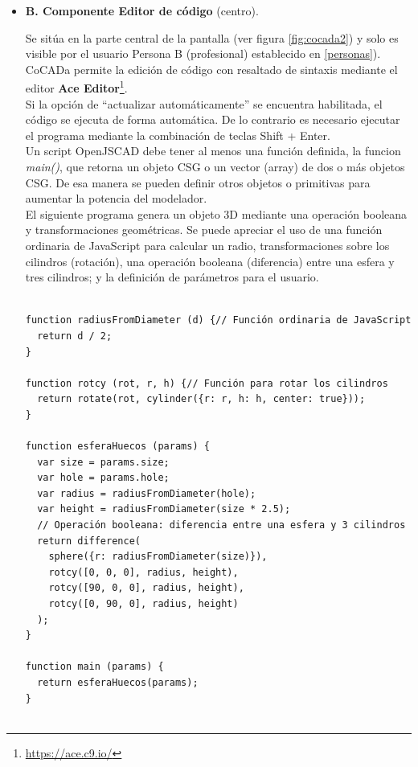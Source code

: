 \begin{itemize}
\item \textbf{B. Componente Editor de código} (centro).

\begin{itemize}
Se sitúa en la parte central de la pantalla (ver figura \ref{fig:cocada2}) y solo es visible por el usuario Persona B (profesional) establecido en \ref{personas}).\\
CoCADa permite la edición de código con  resaltado de sintaxis mediante el editor \textbf{\Gls{Ace Editor}}\footnote{\url{https://ace.c9.io/}}. \\Si la opción de ``actualizar automáticamente'' se encuentra habilitada, el código se ejecuta de forma automática. De lo contrario es necesario ejecutar el programa mediante la combinación de teclas Shift + Enter.\\ 
Un script OpenJSCAD debe tener al menos una función definida, la funcion \textit{main()}, que retorna un objeto CSG o un vector (array) de dos o más objetos CSG. De esa manera se pueden definir otros objetos o primitivas para aumentar la potencia del modelador.\\ 
El siguiente programa genera un objeto 3D mediante una operación booleana y transformaciones geométricas. Se puede apreciar el uso de una función ordinaria de JavaScript para calcular un radio, transformaciones sobre los cilindros (rotación), una operación booleana (diferencia) entre una esfera y tres cilindros; y la definición de parámetros para el usuario. 

\begin{code}
\begin{verbatim}

function radiusFromDiameter (d) {// Función ordinaria de JavaScript
  return d / 2;
}

function rotcy (rot, r, h) {// Función para rotar los cilindros
  return rotate(rot, cylinder({r: r, h: h, center: true}));
}

function esferaHuecos (params) {
  var size = params.size;
  var hole = params.hole;
  var radius = radiusFromDiameter(hole);
  var height = radiusFromDiameter(size * 2.5);
  // Operación booleana: diferencia entre una esfera y 3 cilindros
  return difference(
    sphere({r: radiusFromDiameter(size)}),
    rotcy([0, 0, 0], radius, height),
    rotcy([90, 0, 0], radius, height),
    rotcy([0, 90, 0], radius, height)
  );
}

function main (params) {
  return esferaHuecos(params);
}


\end{verbatim}
\end{code}
\end{itemize}
\end{itemize}
